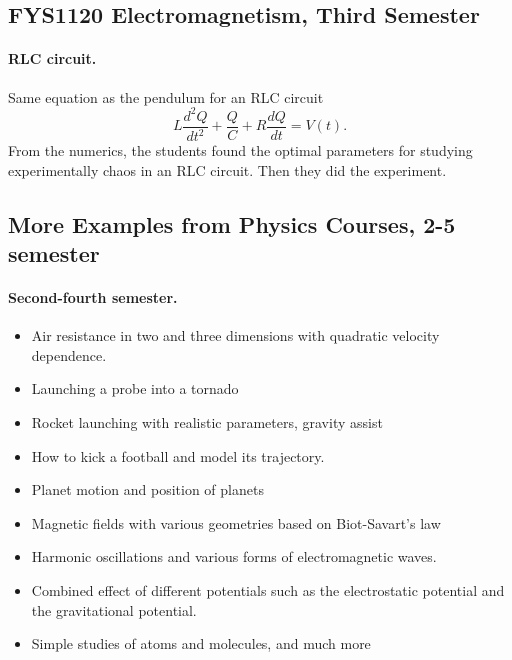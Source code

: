 \documentclass[%
twoside,                 %
final,                   %
10pt]{article}
\begin{document}
\subsection*{FYS1120 Electromagnetism, Third Semester}

\paragraph{RLC circuit.}
Same equation as the pendulum for an RLC circuit 
\[
L\frac{d^2Q}{dt^2}+\frac{Q}{C}+R\frac{dQ}{dt}=V(t).
\]
From the numerics, 
the students found the optimal parameters for studying experimentally chaos
in an RLC circuit. Then they did the experiment.




\subsection*{More Examples from Physics Courses, 2-5 semester}

\paragraph{Second-fourth semester.}

\begin{itemize}
\item Air resistance in two and three dimensions with quadratic velocity dependence.

\item Launching a probe into a tornado

\item Rocket launching with realistic parameters, gravity assist

\item How to kick a football and model its trajectory.

\item Planet motion and position of planets

\item Magnetic fields with various geometries based on Biot-Savart's law

\item Harmonic oscillations and various forms of electromagnetic waves.

\item Combined effect of different potentials such as the electrostatic potential and the gravitational potential.

\item Simple studies of atoms and molecules, and much more
\end{itemize}
\end{document}
